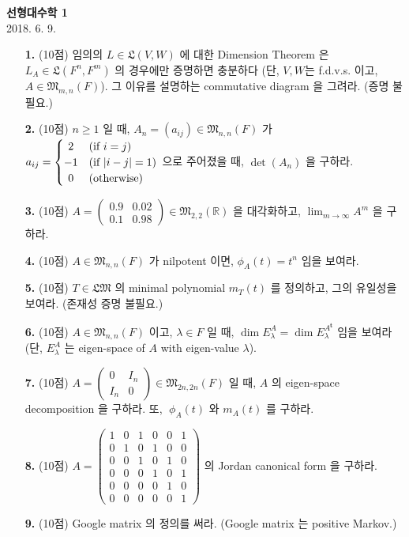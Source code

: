 \documentclass[12pt]{report}
\newcommand*{\trans}{^{\mathrm{\mathbf{t}}}}%
\newcommand*{\matrixM}{\mathfrak{M}}%
\begin{document}
\begin{center}
\textbf{선형대수학 1}\\
2018. 6. 9.
\end{center}

\begin{itemize}
\item[\textbf{1.}] (10점) 임의의 $L\in \mathfrak{L}(V, W)$ 에 대한 Dimension Theorem 은 $L_A \in \mathfrak{L}(F^n, F^m)$ 의 경우에만 증명하면 충분하다 (단, $V, W$는 f.d.v.s. 이고, $A\in\matrixM_{m, n}(F)$). 그 이유를 설명하는 commutative diagram 을 그려라. (증명 불필요.)
\\  
\item[\textbf{2.}] (10점) $n \geq 1$ 일 때, $A_n=(a_{ij})\in\matrixM_{n, n}(F)$ 가 $a_{ij} = \begin{cases}\hfil2&(\text{if } i = j)\\-1&(\text{if } |i-j|=1)\\\hfil0&(\text{otherwise})\end{cases}$ 으로 주어졌을 때, $\det(A_n)$ 을 구하라.
\\
\item[\textbf{3.}] (10점) $A = \begin{pmatrix}0.9&0.02\\0.1&0.98\end{pmatrix}\in \matrixM_{2, 2}(\mathbb{R})$ 을 대각화하고, $\lim_{m\rightarrow \infty}A^m$ 을 구하라.
\\
\item[\textbf{4.}] (10점) $A\in \matrixM_{n, n}(F)$ 가 nilpotent 이면, $\phi_A(t)=t^n$ 임을 보여라.
\\
\item[\textbf{5.}] (10점) $T\in\mathfrak{LM}$ 의 minimal polynomial $m_T(t)$ 를 정의하고, 그의 유일성을 보여라. (존재성 증명 불필요.)
\\
\item[\textbf{6.}] (10점) $A\in \matrixM_{n, n}(F)$ 이고, $\lambda\in F$ 일 때, $\dim E_\lambda^A = \dim E_\lambda^{A\trans}$ 임을 보여라 (단, $E_\lambda^A$ 는 eigen-space of $A$ with eigen-value $\lambda$).
\\
\item[\textbf{7.}] (10점) $A= \begin{pmatrix}0&I_n\\I_n&0\end{pmatrix}\in\! \matrixM_{2n, 2n}(F)$ 일 때, $A$ 의 eigen-space decomposition 을 구하라. 또, $\;$$\phi_A(t)$ 와 $m_A(t)$ 를 구하라.
\\
\item[\textbf{8.}] (10점) $A=\begin{pmatrix}1&0&1&0&0&1\\0&1&0&1&0&0\\0&0&1&0&1&0\\0&0&0&1&0&1\\0&0&0&0&1&0\\0&0&0&0&0&1\end{pmatrix}$ 의 Jordan canonical form 을 구하라.
\\
\item[\textbf{9.}] (10점) Google matrix 의 정의를 써라. (Google matrix 는 positive Markov.)

\end{itemize}
\end{document}
